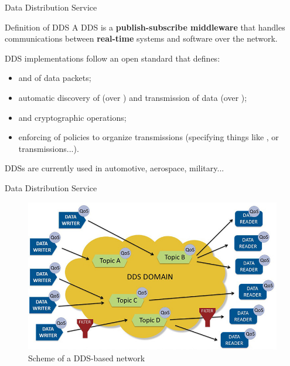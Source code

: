 \begin{frame}{Data Distribution Service}
	\begin{block}{Definition of DDS}
		A DDS is a \textbf{publish-subscribe middleware} that handles communications between \textbf{real-time} systems and software over the network.
	\end{block}
	DDS implementations follow an open standard that defines:
	\begin{itemize}
		\item {} and  of data packets;
		\item automatic discovery of  (over ) and transmission of data (over );
		\item {} and cryptographic operations;
		\item enforcing of  policies to organize transmissions (specifying things like ,  or  transmissions...).
	\end{itemize}
	DDSs are currently used in automotive, aerospace, military...
\end{frame}
\begin{frame}{Data Distribution Service}
	\begin{figure}
		\centering
		\includegraphics[width=.85\textwidth]{ddsDomain.jpg}
		\caption{Scheme of a DDS-based network}
		\label{fig:ddsdomain}
	\end{figure}
\end{frame}
